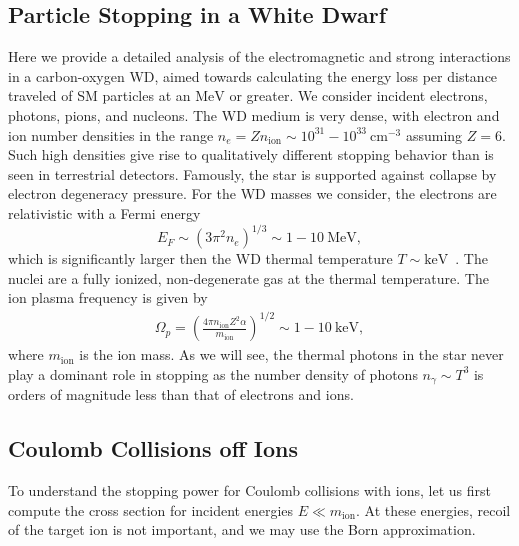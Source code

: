 \documentclass[twocolumn, preprintnumbers,amsmath,amssymb,prd, superscriptaddress]{revtex4}
\newcommand{\MeV}{\text{MeV}}
\newcommand{\keV}{\text{keV}}
\newcommand{\cm}{\text{cm}}
\def\r{\right)}
\def\l{\left(}
\begin{document}
\begin{appendices}

\section{Particle Stopping in a White Dwarf}
\label{sec:wdpdg}
Here we provide a detailed analysis of the electromagnetic and strong interactions in a carbon-oxygen WD, aimed towards calculating the energy loss per distance traveled of SM particles at an $\text{MeV}$ or greater.
We consider incident electrons, photons, pions, and nucleons.
The WD medium is very dense, with electron and ion number densities in the range $n_e = Z n_\text{ion} \sim 10^{31} - 10^{33} ~\cm^{-3}$ assuming $Z=6$.
Such high densities give rise to qualitatively different stopping behavior than is seen in terrestrial detectors.
Famously, the star is supported against collapse by electron degeneracy pressure.
For the WD masses we consider, the electrons are relativistic with a Fermi energy
\begin{equation}
  E_F \sim (3 \pi^2 n_e)^{1/3} \sim 1 -10 ~\MeV,
\end{equation}
which is significantly larger then the WD thermal temperature $T \sim \keV$~\cite{KippenhahnWeigert}.
The nuclei are a fully ionized, non-degenerate gas at the thermal temperature.
The ion plasma frequency is given by
\begin{align}
\Omega_p = \l \frac{4 \pi n_\text{ion} Z^2 \alpha}{m_\text{ion}}\r^{1/2} \sim 1 - 10~\text{keV},
\end{align}
where $m_\text{ion}$ is the ion mass.
As we will see, the thermal photons in the star never play a dominant role in stopping as the number density of photons $n_\gamma \sim T^3$ is orders of magnitude less than that of electrons and ions.

\subsection{Coulomb Collisions off Ions}
\label{sec:coulomb_ion}

To understand the stopping power for Coulomb collisions with ions, let us first compute the cross section for incident energies $E \ll m_\text{ion}$.
At these energies, recoil of the target ion is not important, and we may use the Born approximation.


\end{appendices}
\end{document}
